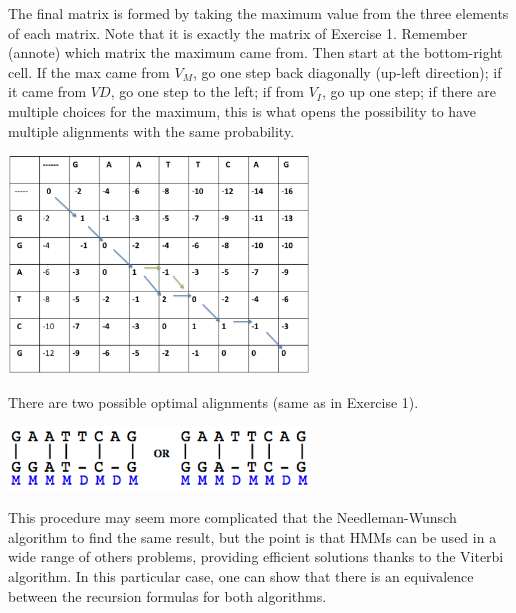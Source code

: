 \documentclass[english, a4paper,11pt]{article}
\begin{document}
The final matrix is formed by taking the maximum value from the three elements of each matrix. Note that it is exactly the matrix of Exercise 1.
Remember (annote) which matrix the maximum came from. Then start at the bottom-right cell. 
If the max came from $V_M$, go one step back diagonally (up-left direction); if it came from $VD$, go one step to the left; if from $V_I$, go up one step; if there are multiple choices for the maximum, this is what opens the possibility to have multiple alignments with the same probability.

\begin{center}
\includegraphics[width=0.6\textwidth]{Slide4.eps}
\end{center}

There are two possible optimal alignments (same as in Exercise 1).

\begin{center}
\includegraphics[width=0.6\textwidth]{alignment2.png}
\end{center}

This procedure may seem more complicated that the Needleman-Wunsch algorithm to find the same result, but the point is that HMMs can be used in a wide range of others problems, providing efficient solutions thanks to the Viterbi algorithm. In this particular case, one can show that there is an equivalence between the recursion formulas for both algorithms.
\end{document}
